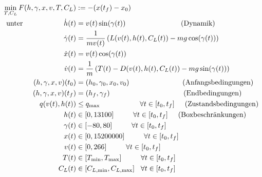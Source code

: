 \[\begin{split}
\min_{T, C_L} F(h,\gamma,x,v,T,C_L) &:= -(x(t_f) - x_0) \\\
\text{unter} \hspace{20mm} \dot{h}(t) &= v(t) \sin(\gamma(t)) \hspace{27mm} \text{(Dynamik)} \\\
\dot{\gamma}(t) &=  \dfrac{1}{mv(t)} \left( L(v(t),h(t),C_L(t)) - mg \cos(\gamma(t)) \right) \\\
\dot{x}(t) &= v(t) \cos(\gamma(t))\\\
\dot{v}(t) &= \dfrac{1}{m} \left( T(t) - D(v(t),h(t),C_L(t)) - mg \sin(\gamma(t)) \right) \\\
%
(h,\gamma,x,v)(t_0) &= (h_0,\gamma_0,x_0,v_0) \hspace{26mm} \text{(Anfangsbedingungen)}\\\
(h,\gamma,x,v)(t_f) &= (h_f,\gamma_f) \hspace{36mm} \text{(Endbedingungen)}\\\
%
q(v(t),h(t)) &\leq q_{\max} \hspace{19.5mm} \forall t \in [t_0,t_f] \hspace{5mm} \text{(Zustandsbedingungen)}\\\
h(t) &\in [0,13100] \hspace{9.5mm} \forall t \in [t_0,t_f] \hspace{5mm} \text{(Boxbeschränkungen)}\\\
\gamma(t) &\in [-80,80] \hspace{9.5mm} \forall t \in [t_0,t_f]\\\
x(t) &\in [0,15200000] \hspace{9.5mm} \forall t \in [t_0,t_f]\\\
v(t) &\in [0,266] \hspace{9.5mm} \forall t \in [t_0,t_f]\\\
T(t) &\in [T_{\min},T_{\max}] \hspace{9.5mm} \forall t \in [t_0,t_f]\\\
C_L(t) &\in [C_{L, \min},C_{L, \max}] \hspace{3mm} \forall t \in [t_0,t_f]
\end{split} \]

